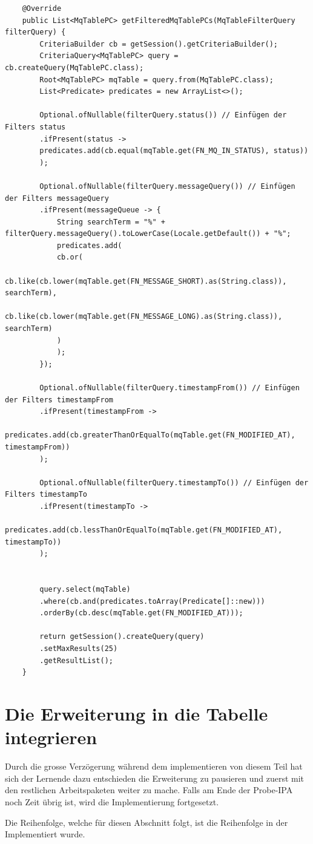 \begin{verbatim}
	@Override
	public List<MqTablePC> getFilteredMqTablePCs(MqTableFilterQuery filterQuery) {
		CriteriaBuilder cb = getSession().getCriteriaBuilder();
		CriteriaQuery<MqTablePC> query = cb.createQuery(MqTablePC.class);
		Root<MqTablePC> mqTable = query.from(MqTablePC.class);
		List<Predicate> predicates = new ArrayList<>();
		
		Optional.ofNullable(filterQuery.status()) // Einfügen der Filters status
		.ifPresent(status ->
		predicates.add(cb.equal(mqTable.get(FN_MQ_IN_STATUS), status))
		);
		
		Optional.ofNullable(filterQuery.messageQuery()) // Einfügen der Filters messageQuery
		.ifPresent(messageQueue -> {
			String searchTerm = "%" + filterQuery.messageQuery().toLowerCase(Locale.getDefault()) + "%";
			predicates.add(
			cb.or(
			cb.like(cb.lower(mqTable.get(FN_MESSAGE_SHORT).as(String.class)), searchTerm),
			cb.like(cb.lower(mqTable.get(FN_MESSAGE_LONG).as(String.class)), searchTerm)
			)
			);
		});
		
		Optional.ofNullable(filterQuery.timestampFrom()) // Einfügen der Filters timestampFrom
		.ifPresent(timestampFrom ->
		predicates.add(cb.greaterThanOrEqualTo(mqTable.get(FN_MODIFIED_AT), timestampFrom))
		);
		
		Optional.ofNullable(filterQuery.timestampTo()) // Einfügen der Filters timestampTo
		.ifPresent(timestampTo ->
		predicates.add(cb.lessThanOrEqualTo(mqTable.get(FN_MODIFIED_AT), timestampTo))
		);
		
		
		query.select(mqTable)
		.where(cb.and(predicates.toArray(Predicate[]::new)))
		.orderBy(cb.desc(mqTable.get(FN_MODIFIED_AT)));
		
		return getSession().createQuery(query)
		.setMaxResults(25)
		.getResultList();
	}
\end{verbatim}

\section{Die Erweiterung in die Tabelle integrieren}
Durch die grosse Verzögerung während dem implementieren von diesem Teil hat sich der Lernende dazu entschieden die Erweiterung zu pausieren und zuerst mit den restlichen Arbeitspaketen weiter zu mache. Falls am Ende der Probe-IPA noch Zeit übrig ist, wird die Implementierung fortgesetzt. 

Die Reihenfolge, welche für diesen Abschnitt folgt, ist die Reihenfolge in der Implementiert wurde.

